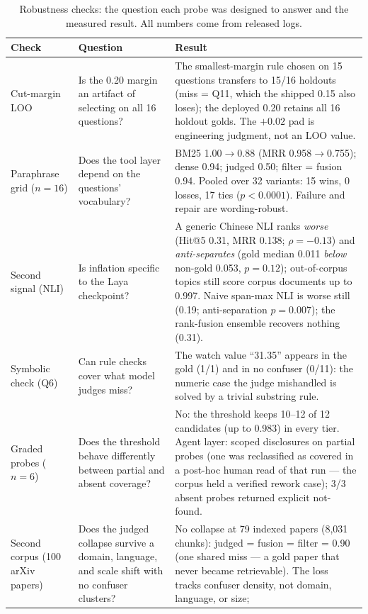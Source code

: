 \begin{table}[!htbp]
\centering
\scriptsize
\setlength{\tabcolsep}{2.5pt}
\caption{Robustness checks: the question each probe was designed to answer
and the measured result. All numbers come from released logs.}
\label{tab:robustness}
\begin{tabular}{p{2.7cm}p{3.9cm}p{5.9cm}}
\toprule
Check & Question & Result \\
\midrule
Cut-margin LOO & Is the 0.20 margin an artifact of selecting on all 16
questions? & The smallest-margin rule chosen on 15 questions transfers to
15/16 holdouts (miss = Q11, which the shipped 0.15 also loses); the
deployed 0.20 retains all 16 holdout golds. The $+0.02$ pad is
engineering judgment, not an LOO value. \\
Paraphrase grid ($n{=}16$) & Does the tool layer depend on the questions'
vocabulary? & BM25 1.00$\to$0.88 (MRR 0.958$\to$0.755); dense 0.94;
judged 0.50; filter = fusion 0.94. Pooled over 32 variants: 15 wins,
0 losses, 17 ties ($p < 0.0001$). Failure and repair are wording-robust. \\
Second signal (NLI) & Is inflation specific to the Laya checkpoint? &
A generic Chinese NLI ranks \emph{worse} (Hit@5 0.31, MRR 0.138;
$\rho = -0.13$) and \emph{anti-separates} (gold median 0.011 \emph{below}
non-gold 0.053, $p = 0.12$); out-of-corpus topics still score corpus
documents up to 0.997. Naive span-max NLI is worse still (0.19;
anti-separation $p = 0.007$); the rank-fusion ensemble recovers nothing
(0.31). \\
Symbolic check (Q6) & Can rule checks cover what model judges miss? &
The watch value ``31.35'' appears in the gold (1/1) and in no confuser
(0/11): the numeric case the judge mishandled is solved by a trivial
substring rule. \\
Graded probes ($n{=}6$) & Does the threshold behave differently between
partial and absent coverage? & No: the threshold keeps 10--12 of 12
candidates (up to 0.983) in every tier. Agent layer: scoped disclosures
on partial probes (one was reclassified as covered in a post-hoc human
read of that run --- the corpus held a
verified rework case); 3/3 absent probes returned explicit not-found. \\
Second corpus (100 arXiv papers) & Does the judged collapse survive a
domain, language, and scale shift with no confuser clusters? & No
collapse at 79 indexed papers (8{,}031 chunks): judged = fusion =
filter = 0.90 (one shared miss --- a gold paper that never became
retrievable).
The loss tracks confuser density, not domain, language, or size;

\end{tabular}
\end{table}
